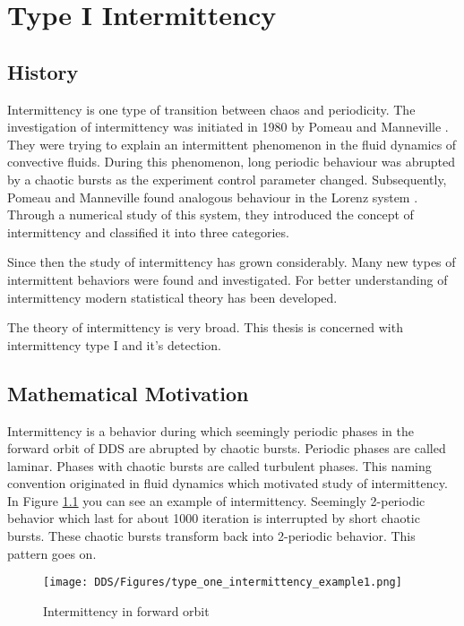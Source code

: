 \chapter{Type I Intermittency}
\label{chap:intermittency_review}

\section{History}
Intermittency is one type of transition between chaos and periodicity.
The investigation of intermittency was initiated in 1980 by Pomeau and Manneville \cite{Pomeau1980}.
They were trying to explain an intermittent phenomenon in the fluid dynamics of convective fluids.
During this phenomenon, long periodic behaviour was abrupted by a chaotic bursts as the experiment control parameter changed.
Subsequently, Pomeau and Manneville found analogous behaviour in the Lorenz system \cite{Lorenz2004}.
Through a numerical study of this system, they introduced the concept of intermittency and classified it into three categories. \cite{Pomeau1980}
\par
Since then the study of intermittency has grown considerably.
Many new types of intermittent behaviors were found and investigated.
For better understanding of intermittency modern statistical theory has been developed.
\cite{Elaskar2017}
\par
The theory of intermittency is very broad.
This thesis is concerned with intermittency type I and it's detection.

\section{Mathematical Motivation}
Intermittency is a behavior during which seemingly periodic phases in the forward orbit of DDS are abrupted by chaotic bursts.
Periodic phases are called laminar.
Phases with chaotic bursts are called turbulent phases.
This naming convention originated in fluid dynamics which motivated study of intermittency. \cite{Pomeau1980}
\\
In Figure \ref{fig:intermittent_forward_orbit_example} you can see an example of intermittency.
Seemingly 2-periodic behavior which last for about 1000 iteration is interrupted by short chaotic bursts.
These chaotic bursts transform back into 2-periodic behavior.
This pattern goes on.

\begin{figure}[!h]
    \centering
    \texttt{[image: DDS/Figures/type\_one\_intermittency\_example1.png]}
    \caption{Intermittency in forward orbit}
    \label{fig:intermittent_forward_orbit_example}
\end{figure}

